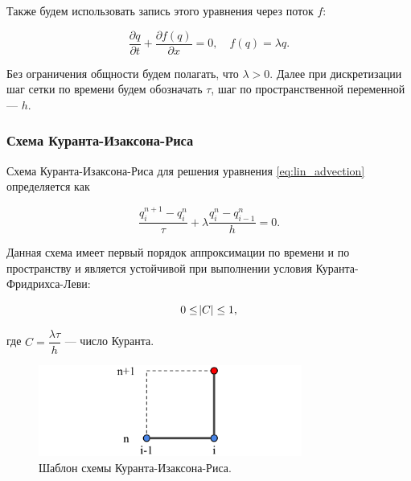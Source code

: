 \noindent Также будем использовать запись этого уравнения через поток $f$:

\begin{equation}
    \dfrac{\partial q}{\partial t} + \dfrac{\partial f (q)}{\partial x} = 0 , \quad
    f(q) = \lambda q .
\label{eq:lin_advection_flux}
\end{equation}

\noindent Без ограничения общности будем полагать, что  $\lambda > 0$. Далее при дискретизации шаг сетки по времени будем обозначать $\tau$, шаг по пространственной переменной --- $h$.

\subsubsection{Схема Куранта-Изаксона-Риса}

Схема Куранта-Изаксона-Риса \cite{cir_scheme, petrov_lobanov_book} для решения уравнения \eqref{eq:lin_advection} определяется как

\begin{equation}
    \dfrac{q_i^{n+1} - q_i^n}{\tau} + \lambda\dfrac{q_i^n - q_{i-1}^n}{h} = 0 .
\label{eq:cir_scheme}
\end{equation}

\noindent Данная схема имеет первый порядок аппроксимации по времени и по пространству и является устойчивой при выполнении условия Куранта-Фридрихса-Леви:

\begin{equation}
    0 \leq \abs{C} \leq 1 ,
    \label{eq:cfl_condition}
\end{equation}

\noindent где $C = \dfrac{\lambda \tau}{h}$ --- число Куранта.

\begin{figure}[htb]
    \centering
    \includegraphics[height=3cm]{images/theory/scheme_cir.png}
    \caption{Шаблон схемы Куранта-Изаксона-Риса.}
    \label{fig:scheme_cir}
\end{figure}

